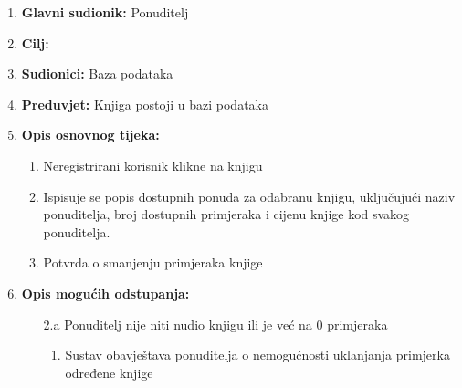\documentclass[12pt]{report}
\begin{document}
\noindent {}
\begin{enumerate}
	
	\item \textbf{Glavni sudionik: } Ponuditelj
	\item  \textbf{Cilj:} 
	\item  \textbf{Sudionici:} Baza podataka
	\item  \textbf{Preduvjet:} Knjiga postoji u bazi podataka
	\item  \textbf{Opis osnovnog tijeka:}
	
	\begin{enumerate}
		
		\item Neregistrirani korisnik klikne na knjigu 
		\item Ispisuje se popis dostupnih ponuda za odabranu knjigu, uključujući naziv ponuditelja, broj dostupnih primjeraka i cijenu knjige kod svakog ponuditelja.
		\item Potvrda o smanjenju primjeraka knjige 
		
	\end{enumerate}
	
	\item  \textbf{Opis mogućih odstupanja:}
	
	\item[] \begin{enumerate}
		
		\item[2.a] Ponuditelj nije niti nudio knjigu ili je već na 0 primjeraka 
		\item[] \begin{enumerate}
			
			\item Sustav obavještava ponuditelja o nemogućnosti uklanjanja primjerka određene knjige
			
		\end{enumerate}
		
	\end{enumerate}
	
\end{enumerate}
\end{document}
